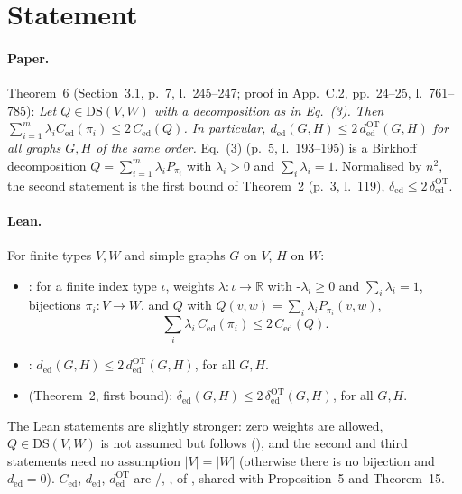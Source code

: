 

\paperversion

\section{Statement}

\paragraph{Paper.} Theorem~6 (Section~3.1, p.~7, l.~245--247; proof in App.~C.2, pp.~24--25, l.~761--785):
\emph{Let $Q\in\mathrm{DS}(V,W)$ with a decomposition as in Eq.~(3). Then
$\sum_{i=1}^m\lambda_iC_{\mathrm{ed}}(\pi_i)\le2\,C_{\mathrm{ed}}(Q)$. In particular,
$d_{\mathrm{ed}}(G,H)\le2\,d^{\mathrm{OT}}_{\mathrm{ed}}(G,H)$ for all graphs $G,H$ of the same order.}
Eq.~(3) (p.~5, l.~193--195) is a Birkhoff decomposition $Q=\sum_{i=1}^m\lambda_iP_{\pi_i}$ with $\lambda_i>0$
and $\sum_i\lambda_i=1$. Normalised by $n^2$, the second statement is the first bound of Theorem~2
(p.~3, l.~119), $\delta_{\mathrm{ed}}\le2\,\delta^{\mathrm{OT}}_{\mathrm{ed}}$.

\paragraph{Lean.} For finite types $V,W$ and simple graphs $G$ on $V$, $H$ on $W$:
\begin{itemize}
\item {}: for a finite index type $\iota$, weights $\lambda\colon\iota\to\mathbb R$ with
  \hyp{$\lambda_i\ge0$} and $\sum_i\lambda_i=1$, bijections $\pi_i\colon V\to W$, and $Q$ with
  $Q(v,w)=\sum_i\lambda_iP_{\pi_i}(v,w)$,
  \[ \textstyle\sum_i\lambda_i\,C_{\mathrm{ed}}(\pi_i)\le2\,C_{\mathrm{ed}}(Q). \]
\item {}: $d_{\mathrm{ed}}(G,H)\le2\,d^{\mathrm{OT}}_{\mathrm{ed}}(G,H)$, for all $G,H$.
\item {} (Theorem~2, first bound):
  $\delta_{\mathrm{ed}}(G,H)\le2\,\delta^{\mathrm{OT}}_{\mathrm{ed}}(G,H)$, for all $G,H$.
\end{itemize}
The Lean statements are slightly stronger: zero weights are allowed, $Q\in\mathrm{DS}(V,W)$ is not assumed but
follows (), and the second and third statements need no assumption $|V|=|W|$
(otherwise there is no bijection and $d_{\mathrm{ed}}=0$). $C_{\mathrm{ed}}$, $d_{\mathrm{ed}}$,
$d^{\mathrm{OT}}_{\mathrm{ed}}$ are /, ,  of
, shared with Proposition~5 and Theorem~15.

